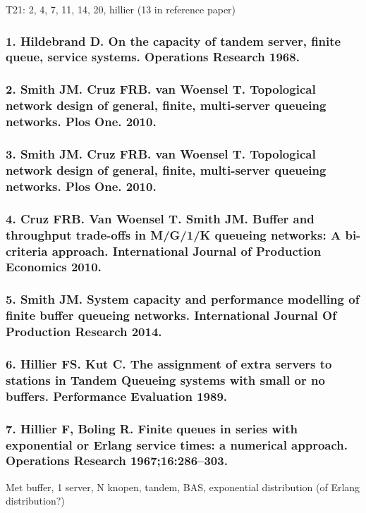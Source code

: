 \documentclass[12pt]{report}
\begin{document}
T21: 2, 4, 7, 11, 14, 20, hillier (13 in reference paper)
\subsubsection*{1. Hildebrand D. On the capacity of tandem server, finite queue, service systems. Operations Research 1968.}
\subsubsection*{2. Smith JM. Cruz FRB. van Woensel T. Topological network design of general, finite, multi-server queueing networks. Plos One. 2010.}
\subsubsection*{3. Smith JM. Cruz FRB. van Woensel T. Topological network design of general, finite, multi-server queueing networks. Plos One. 2010.}
\subsubsection*{4. Cruz FRB. Van Woensel T. Smith JM. Buffer and throughput trade-offs in M/G/1/K queueing networks: A bi-criteria approach. International Journal of Production Economics 2010.}
\subsubsection*{5. Smith JM. System capacity and performance modelling of finite buffer queueing networks. International Journal Of Production Research 2014.}
\subsubsection*{6. Hillier FS. Kut C. The assignment of extra servers to stations in Tandem Queueing systems with small or no buffers. Performance Evaluation 1989.}
\subsubsection*{7. Hillier F, Boling R. Finite queues in series with exponential or Erlang service
times: a numerical approach. Operations Research 1967;16:286–303.}
Met buffer, 1 server, N knopen, tandem, BAS, exponential distribution (of Erlang distribution?)
\end{document}
